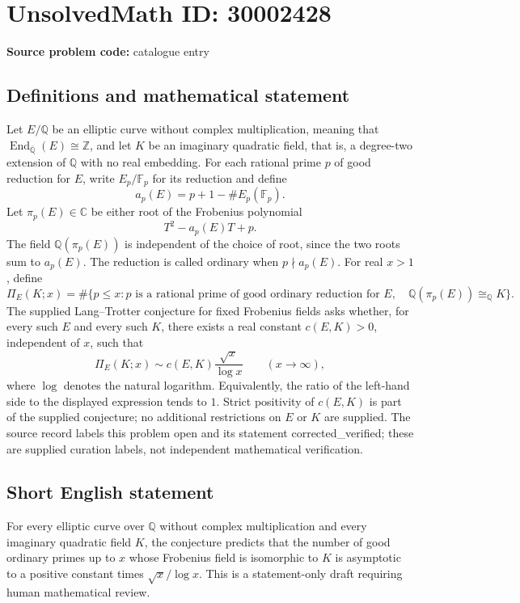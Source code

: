 \documentclass[11pt]{article}
\newcommand{\Z}{\mathbb{Z}}
\newcommand{\Q}{\mathbb{Q}}
\newcommand{\C}{\mathbb{C}}
\newcommand{\F}{\mathbb{F}}
\begin{document}
\section*{UnsolvedMath ID: 30002428}
\textbf{Source problem code:} catalogue entry
\subsection{Definitions and mathematical statement}
Let \(E/\Q\) be an elliptic curve without complex multiplication, meaning that \(\operatorname{End}_{\overline{\Q}}(E)\cong\Z\), and let \(K\) be an imaginary quadratic field, that is, a degree-two extension of \(\Q\) with no real embedding. For each rational prime \(p\) of good reduction for \(E\), write \(E_p/\F_p\) for its reduction and define
\[
a_p(E)=p+1-\#E_p(\F_p).
\]
Let \(\pi_p(E)\in\C\) be either root of the Frobenius polynomial
\[
T^2-a_p(E)T+p.
\]
The field \(\Q(\pi_p(E))\) is independent of the choice of root, since the two roots sum to \(a_p(E)\). The reduction is called ordinary when \(p\nmid a_p(E)\). For real \(x>1\), define
\[
\Pi_E(K;x)=\#\bigl\{p\le x : p\text{ is a rational prime of good ordinary reduction for }E,\quad \Q(\pi_p(E))\cong_{\Q}K\bigr\}.
\]
The supplied Lang--Trotter conjecture for fixed Frobenius fields asks whether, for every such \(E\) and every such \(K\), there exists a real constant \(c(E,K)>0\), independent of \(x\), such that
\[
\Pi_E(K;x)\sim c(E,K)\frac{\sqrt{x}}{\log x}\qquad(x\to\infty),
\]
where \(\log\) denotes the natural logarithm. Equivalently, the ratio of the left-hand side to the displayed expression tends to \(1\). Strict positivity of \(c(E,K)\) is part of the supplied conjecture; no additional restrictions on \(E\) or \(K\) are supplied. The source record labels this problem open and its statement corrected\_verified; these are supplied curation labels, not independent mathematical verification.
\subsection{Short English statement}
For every elliptic curve over \(\Q\) without complex multiplication and every imaginary quadratic field \(K\), the conjecture predicts that the number of good ordinary primes up to \(x\) whose Frobenius field is isomorphic to \(K\) is asymptotic to a positive constant times \(\sqrt{x}/\log x\). This is a statement-only draft requiring human mathematical review.
\end{document}
